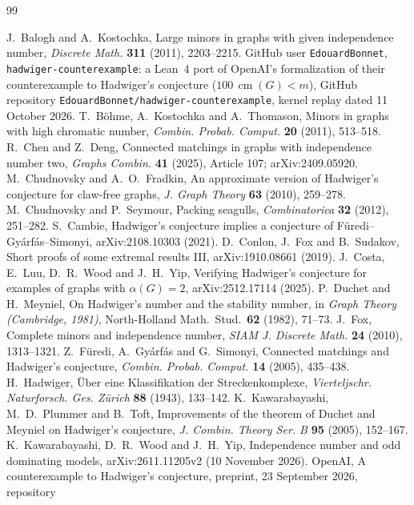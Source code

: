 \documentclass[11pt]{article}
\theoremstyle{definition}\newtheorem{conjecture}[theorem]{Conjecture}
\theoremstyle{remark}\newtheorem{remark}[theorem]{Remark}
\newcommand{\cm}{\operatorname{cm}}
\begin{document}
\begin{thebibliography}{99}\raggedright
{} J.~Balogh and A.~Kostochka, Large minors in graphs with given independence number, \emph{Discrete Math.}
\textbf{311} (2011), 2203--2215.
 GitHub user \texttt{EdouardBonnet}, \texttt{hadwiger-counterexample}: a Lean~4 port of OpenAI's
formalization of their counterexample to Hadwiger's conjecture ($100\,\cm(G)<m$), GitHub repository
\texttt{EdouardBonnet/hadwiger-counterexample}, kernel replay dated 11 October 2026.
 T.~B\"ohme, A.~Kostochka and A.~Thomason, Minors in graphs with high chromatic number, \emph{Combin.
Probab. Comput.} \textbf{20} (2011), 513--518.
 R.~Chen and Z.~Deng, Connected matchings in graphs with independence number two, \emph{Graphs Combin.}
\textbf{41} (2025), Article 107; arXiv:2409.05920.
 M.~Chudnovsky and A.~O.~Fradkin, An approximate version of Hadwiger's conjecture for claw-free graphs,
\emph{J. Graph Theory} \textbf{63} (2010), 259--278.
 M.~Chudnovsky and P.~Seymour, Packing seagulls, \emph{Combinatorica} \textbf{32} (2012), 251--282.
 S.~Cambie, Hadwiger's conjecture implies a conjecture of F\"uredi--Gy\'arf\'as--Simonyi, arXiv:2108.10303 (2021).
 D.~Conlon, J.~Fox and B.~Sudakov, Short proofs of some extremal results III, arXiv:1910.08661 (2019).
 J.~Costa, E.~Luu, D.~R.~Wood and J.~H.~Yip, Verifying Hadwiger's conjecture for examples of graphs with
$\alpha(G)=2$, arXiv:2512.17114 (2025).
 P.~Duchet and H.~Meyniel, On Hadwiger's number and the stability number, in \emph{Graph Theory (Cambridge, 1981)},
North-Holland Math.\ Stud.\ \textbf{62} (1982), 71--73.
 J.~Fox, Complete minors and independence number, \emph{SIAM J. Discrete Math.} \textbf{24} (2010), 1313--1321.
 Z.~F\"uredi, A.~Gy\'arf\'as and G.~Simonyi, Connected matchings and Hadwiger's conjecture,
\emph{Combin. Probab. Comput.} \textbf{14} (2005), 435--438.
 H.~Hadwiger, \"Uber eine Klassifikation der Streckenkomplexe, \emph{Vierteljschr. Naturforsch. Ges. Z\"urich}
\textbf{88} (1943), 133--142.
 K.~Kawarabayashi, M.~D.~Plummer and B.~Toft, Improvements of the theorem of Duchet and Meyniel on Hadwiger's
conjecture, \emph{J. Combin. Theory Ser. B} \textbf{95} (2005), 152--167.
 K.~Kawarabayashi, D.~R.~Wood and J.~H.~Yip, Independence number and odd dominating models,
arXiv:2611.11205v2 (10 November 2026).
 OpenAI, A counterexample to Hadwiger's conjecture, preprint, 23 September 2026, repository

\end{thebibliography}
\end{document}
